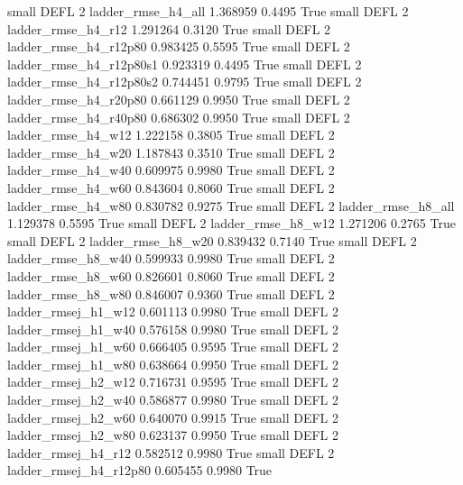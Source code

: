      small     DEFL                 2       ladder_rmse_h4_all   1.368959      0.4495    True
     small     DEFL                 2       ladder_rmse_h4_r12   1.291264      0.3120    True
     small     DEFL                 2    ladder_rmse_h4_r12p80   0.983425      0.5595    True
     small     DEFL                 2  ladder_rmse_h4_r12p80s1   0.923319      0.4495    True
     small     DEFL                 2  ladder_rmse_h4_r12p80s2   0.744451      0.9795    True
     small     DEFL                 2    ladder_rmse_h4_r20p80   0.661129      0.9950    True
     small     DEFL                 2    ladder_rmse_h4_r40p80   0.686302      0.9950    True
     small     DEFL                 2       ladder_rmse_h4_w12   1.222158      0.3805    True
     small     DEFL                 2       ladder_rmse_h4_w20   1.187843      0.3510    True
     small     DEFL                 2       ladder_rmse_h4_w40   0.609975      0.9980    True
     small     DEFL                 2       ladder_rmse_h4_w60   0.843604      0.8060    True
     small     DEFL                 2       ladder_rmse_h4_w80   0.830782      0.9275    True
     small     DEFL                 2       ladder_rmse_h8_all   1.129378      0.5595    True
     small     DEFL                 2       ladder_rmse_h8_w12   1.271206      0.2765    True
     small     DEFL                 2       ladder_rmse_h8_w20   0.839432      0.7140    True
     small     DEFL                 2       ladder_rmse_h8_w40   0.599933      0.9980    True
     small     DEFL                 2       ladder_rmse_h8_w60   0.826601      0.8060    True
     small     DEFL                 2       ladder_rmse_h8_w80   0.846007      0.9360    True
     small     DEFL                 2      ladder_rmsej_h1_w12   0.601113      0.9980    True
     small     DEFL                 2      ladder_rmsej_h1_w40   0.576158      0.9980    True
     small     DEFL                 2      ladder_rmsej_h1_w60   0.666405      0.9595    True
     small     DEFL                 2      ladder_rmsej_h1_w80   0.638664      0.9950    True
     small     DEFL                 2      ladder_rmsej_h2_w12   0.716731      0.9595    True
     small     DEFL                 2      ladder_rmsej_h2_w40   0.586877      0.9980    True
     small     DEFL                 2      ladder_rmsej_h2_w60   0.640070      0.9915    True
     small     DEFL                 2      ladder_rmsej_h2_w80   0.623137      0.9950    True
     small     DEFL                 2      ladder_rmsej_h4_r12   0.582512      0.9980    True
     small     DEFL                 2   ladder_rmsej_h4_r12p80   0.605455      0.9980    True
